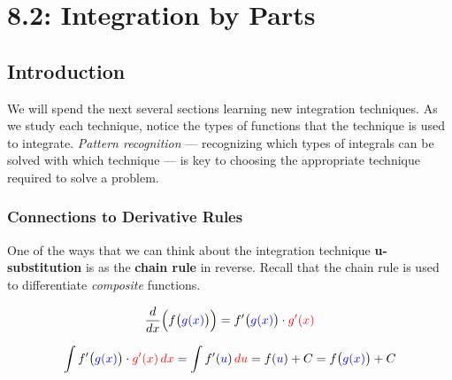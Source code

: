 \documentclass[12pt]{article}
\begin{document}
\section*{8.2: Integration by Parts}


\vspace{5mm}

\subsection*{Introduction}

We will spend the next several sections learning new integration techniques. As we study each technique, notice the types of functions that the technique is used to integrate. \textit{Pattern recognition} --- recognizing which types of integrals can be solved with which technique --- is key to choosing the appropriate technique required to solve a problem. 


\subsubsection*{Connections to Derivative Rules}

One of the ways that we can think about the integration technique \textbf{u-substitution} is as the \textbf{chain rule} in reverse. Recall that the chain rule is used to differentiate \textit{composite} functions.

$$\frac{d}{dx}\Big(f\big(\textcolor{blue}{g(x)}\big)\Big)=f'\big(\textcolor{blue}{g(x)}\big)\cdot \textcolor{red}{g'(x)}$$

$$\int f'\big(\textcolor{blue}{g(x)}\big)\cdot\textcolor{red}{g'(x)\,dx} = \int f'(\textcolor{blue}{u})\,\textcolor{red}{du}=f(\textcolor{blue}{u})+C=f\big(\textcolor{blue}{g(x)}\big)+C $$
\end{document}
